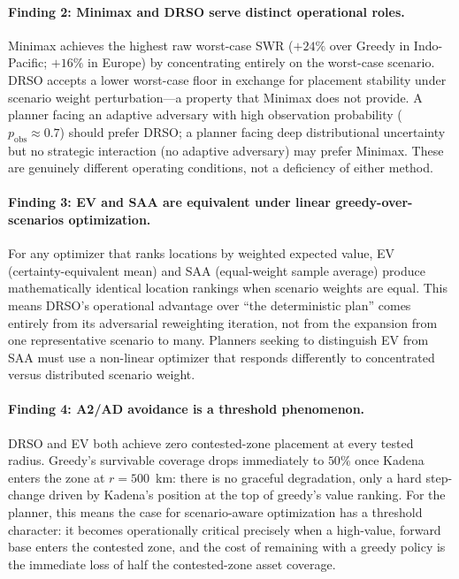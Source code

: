 \documentclass[11pt]{article}
\begin{document}
\paragraph{Finding 2: Minimax and DRSO serve distinct operational roles.}
Minimax achieves the highest raw worst-case SWR ($+24\%$ over Greedy
in Indo-Pacific; $+16\%$ in Europe) by concentrating entirely on the
worst-case scenario.
DRSO accepts a lower worst-case floor in exchange for placement
stability under scenario weight perturbation---a property that
Minimax does not provide.
A planner facing an adaptive adversary with high observation
probability ($p_\mathrm{obs} \approx 0.7$) should prefer DRSO;
a planner facing deep distributional uncertainty but no strategic
interaction (no adaptive adversary) may prefer Minimax.
These are genuinely different operating conditions, not a deficiency
of either method.

\paragraph{Finding 3: EV and SAA are equivalent under linear
greedy-over-scenarios optimization.}
For any optimizer that ranks locations by weighted expected value,
EV (certainty-equivalent mean) and SAA (equal-weight sample average)
produce mathematically identical location rankings when scenario
weights are equal.
This means DRSO's operational advantage over ``the deterministic
plan'' comes entirely from its adversarial reweighting iteration,
not from the expansion from one representative scenario to many.
Planners seeking to distinguish EV from SAA must use a non-linear
optimizer that responds differently to concentrated versus distributed
scenario weight.

\paragraph{Finding 4: A2/AD avoidance is a threshold phenomenon.}
DRSO and EV both achieve zero contested-zone placement at every tested
radius.
Greedy's survivable coverage drops immediately to $50\%$ once Kadena
enters the zone at $r = 500$~km: there is no graceful degradation, only
a hard step-change driven by Kadena's position at the top of greedy's
value ranking.
For the planner, this means the case for scenario-aware optimization
has a threshold character: it becomes operationally critical precisely
when a high-value, forward base enters the contested zone, and the
cost of remaining with a greedy policy is the immediate loss of half
the contested-zone asset coverage.
\end{document}
